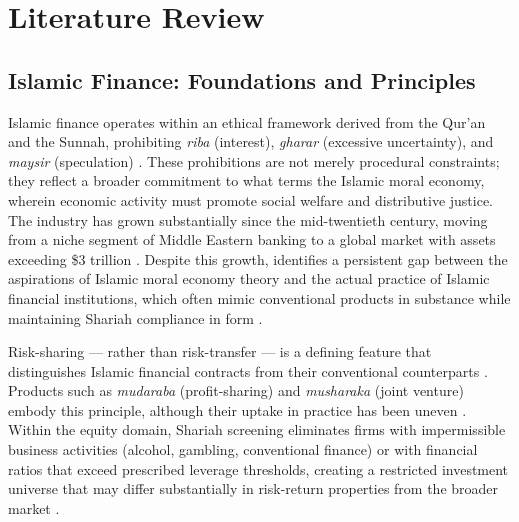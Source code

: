 %
%

\section{Literature Review}
\label{sec:lit_review}

\subsection{Islamic Finance: Foundations and Principles}
\label{subsec:islamic_finance}

Islamic finance operates within an ethical framework derived from the Qur'an
and the Sunnah, prohibiting \textit{riba} (interest), \textit{gharar}
(excessive uncertainty), and \textit{maysir} (speculation)
\citep{ayub2009understanding, elgamal2006islamic}. These prohibitions are not
merely procedural constraints; they reflect a broader commitment to what
\citet{asutay2007conceptualisation} terms the Islamic moral economy, wherein
economic activity must promote social welfare and distributive justice. The
industry has grown substantially since the mid-twentieth century, moving from a
niche segment of Middle Eastern banking to a global market with assets
exceeding \$3 trillion \citep{chachi2006thirty}. Despite this growth,
\citet{asutay2012conceptualising} identifies a persistent gap between the
aspirations of Islamic moral economy theory and the actual practice of Islamic
financial institutions, which often mimic conventional products in substance
while maintaining Shariah compliance in form \citep{chong2009islamic}.

Risk-sharing — rather than risk-transfer — is a defining feature that
distinguishes Islamic financial contracts from their conventional counterparts
\citep{chapra2000future}. Products such as \textit{mudaraba} (profit-sharing)
and \textit{musharaka} (joint venture) embody this principle, although their
uptake in practice has been uneven \citep{ahmed2016product}. Within the equity
domain, Shariah screening eliminates firms with impermissible business
activities (alcohol, gambling, conventional finance) or with financial ratios
that exceed prescribed leverage thresholds, creating a restricted investment
universe that may differ substantially in risk-return properties from the
broader market \citep{aysan2016islamic}.

